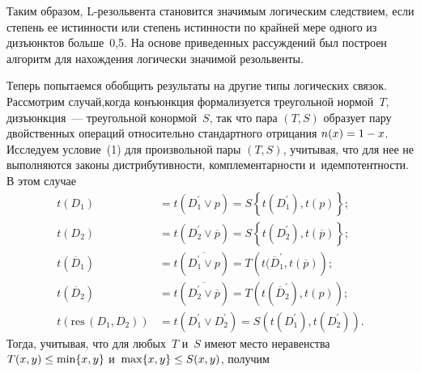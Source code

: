 \begin{multicols}{2}
  Таким образом, L-ре\-золь\-вен\-та становится значимым логическим 
следствием, если степень ее истинности или степень истинности по крайней 
мере одного из дизъюнктов больше~0,5. На основе приведенных рассуждений 
был построен алгоритм для нахождения логически значимой резольвенты.
  
  Теперь попытаемся обобщить результаты на другие типы логических связок. 
Рассмотрим случай,\linebreak когда конъюнкция формализуется треугольной 
нормой~$T$, дизъюнкция~--- треугольной конормой~$S$, так что пара $(T,S)$ 
образует пару двойственных операций относительно стандартного отрицания 
$n(x)\hm=1\hm-x$. Исследуем условие~(1) для произвольной пары $(T,S)$, 
учитывая, что для нее не выполняются законы дистрибутивности, 
комплементарности и~идемпотентности.
  В этом случае
  \begin{align*}
  t(D_1)&=t\left(D_1^\prime\vee p\right) =S\left\{ t(D_1^\prime), t(p)\right\};\\
  t(D_2)&=t\left(D_2^\prime\vee \overline{p}\right) =S\left\{ t(D_2^\prime), 
t(\overline{p})\right\};\\
  t\left(\overline{D}_1\right) &=t\left( \overline{D_1^\prime\vee p}\right) =T\left( 
t(\overline{D}_1^\prime, t\left(\overline{p}\right)\right);\\
  t\left( \overline{D}_2\right) &=t\left( \overline{D_2^\prime \vee 
\overline{p}}\right) =T\left( t\left(\overline{D}_2^\prime\right),  t(p)\right);\\
  t\left( \mathrm{res}\, (D_1, D_2)\right) &= t(D_1^\prime\vee D_2^\prime) =S\left( 
t(D_1^\prime), t(D_2^\prime)\right).
  \end{align*}
  Тогда, учитывая, что для любых~$T$ и~$S$ имеют мес\-то неравенства 
$T(x,y)\hm\leq \min\{x,y\}$ и~$\max \{ x,y\} \hm\leq S(x,y)$, получим

\vspace*{-4pt}


\end{multicols}

